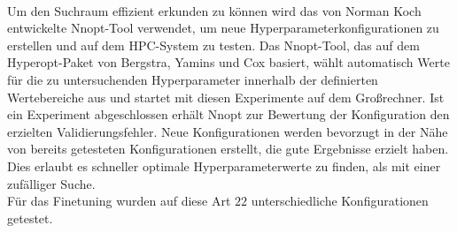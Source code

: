 \\
Um den Suchraum effizient erkunden zu können wird das von Norman Koch entwickelte Nnopt-Tool verwendet, um neue Hyperparameterkonfigurationen zu erstellen und auf dem HPC-System zu testen. Das Nnopt-Tool, das auf dem Hyperopt-Paket \cite{hyperopt} von Bergstra, Yamins und Cox basiert, wählt automatisch Werte für die zu untersuchenden Hyperparameter innerhalb der definierten Wertebereiche aus und startet mit diesen Experimente auf dem Großrechner. Ist ein Experiment abgeschlossen erhält Nnopt zur Bewertung der Konfiguration den erzielten Validierungsfehler. Neue Konfigurationen werden bevorzugt in der Nähe von bereits getesteten Konfigurationen erstellt, die gute Ergebnisse erzielt haben. Dies erlaubt es schneller optimale Hyperparameterwerte zu finden, als mit einer zufälliger Suche.
\\
Für das Finetuning wurden auf diese Art $22$ unterschiedliche Konfigurationen getestet.  


 